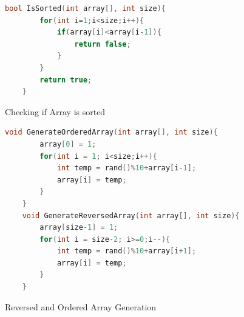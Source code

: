 \documentclass[]{article}
\begin{document}
\begin{figure}[H]\label{IsSorted}
	\caption{Checking if Array is sorted}
	\begin{lstlisting}[language=c++]
	bool IsSorted(int array[], int size){
		for(int i=1;i<size;i++){
			if(array[i]<array[i-1]){
				return false;
			}
		}
		return true;
	}
	\end{lstlisting}
\end{figure}
\begin{figure}[H]\label{ReversedOrdered}
	\caption{Reversed and Ordered Array Generation}
	\begin{lstlisting}[language=c++]
	void GenerateOrderedArray(int array[], int size){
		array[0] = 1;
		for(int i = 1; i<size;i++){
			int temp = rand()%10+array[i-1];
			array[i] = temp;
		}
	}
	void GenerateReversedArray(int array[], int size){
		array[size-1] = 1;
		for(int i = size-2; i>=0;i--){
			int temp = rand()%10+array[i+1];
			array[i] = temp;
		}
	}
	\end{lstlisting}
\end{figure}
\end{document}
